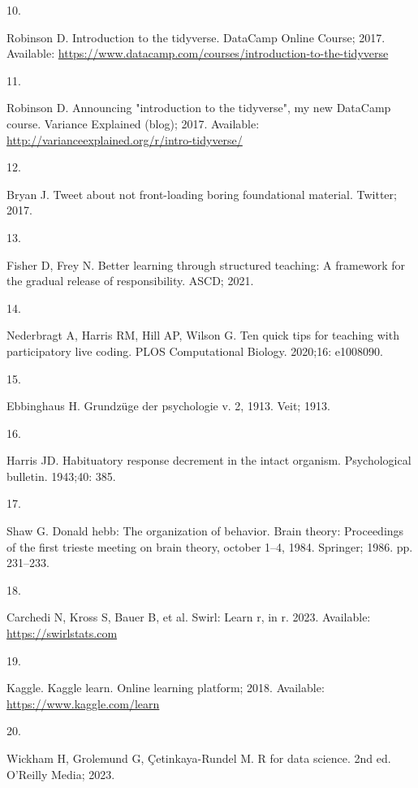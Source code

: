 \documentclass[
  10pt,
  letterpaper,
]{article}
\newlength{\cslhangindent}
\newlength{\csllabelwidth}
\newenvironment{CSLReferences}[2] %
 {\begin{list}{}{%
  \setlength{\itemindent}{0pt}
  \setlength{\leftmargin}{0pt}
  \setlength{\parsep}{0pt}
  \ifodd #1
   \setlength{\leftmargin}{\cslhangindent}
   \setlength{\itemindent}{-1\cslhangindent}
  \fi
  \setlength{\itemsep}{#2\baselineskip}}}
 {\end{list}}
\newcommand{\CSLLeftMargin}[1]{\parbox[t]{\csllabelwidth}{\strut#1\strut}}
\newcommand{\CSLRightInline}[1]{\parbox[t]{\linewidth - \csllabelwidth}{\strut#1\strut}}
\begin{document}
\begin{CSLReferences}{0}{1}
\CSLLeftMargin{10. }%
\CSLRightInline{Robinson D. Introduction to the tidyverse. DataCamp
Online Course; 2017. Available:
\url{https://www.datacamp.com/courses/introduction-to-the-tidyverse}}

\CSLLeftMargin{11. }%
\CSLRightInline{Robinson D. Announcing "introduction to the tidyverse",
my new DataCamp course. Variance Explained (blog); 2017. Available:
\url{http://varianceexplained.org/r/intro-tidyverse/}}

\CSLLeftMargin{12. }%
\CSLRightInline{Bryan J. Tweet about not front-loading boring
foundational material. Twitter; 2017. }

\CSLLeftMargin{13. }%
\CSLRightInline{Fisher D, Frey N. Better learning through structured
teaching: A framework for the gradual release of responsibility. ASCD;
2021. }

\CSLLeftMargin{14. }%
\CSLRightInline{Nederbragt A, Harris RM, Hill AP, Wilson G. Ten quick
tips for teaching with participatory live coding. PLOS Computational
Biology. 2020;16: e1008090. }

\CSLLeftMargin{15. }%
\CSLRightInline{Ebbinghaus H. Grundzüge der psychologie v. 2, 1913.
Veit; 1913. }

\CSLLeftMargin{16. }%
\CSLRightInline{Harris JD. Habituatory response decrement in the intact
organism. Psychological bulletin. 1943;40: 385. }

\CSLLeftMargin{17. }%
\CSLRightInline{Shaw G. Donald hebb: The organization of behavior. Brain
theory: Proceedings of the first trieste meeting on brain theory,
october 1--4, 1984. Springer; 1986. pp. 231--233. }

\CSLLeftMargin{18. }%
\CSLRightInline{Carchedi N, Kross S, Bauer B, et al. Swirl: Learn r, in
r. 2023. Available: \url{https://swirlstats.com}}

\CSLLeftMargin{19. }%
\CSLRightInline{Kaggle. Kaggle learn. Online learning platform; 2018.
Available: \url{https://www.kaggle.com/learn}}

\CSLLeftMargin{20. }%
\CSLRightInline{Wickham H, Grolemund G, Çetinkaya-Rundel M. R for data
science. 2nd ed. O'Reilly Media; 2023. }


\end{CSLReferences}
\end{document}
